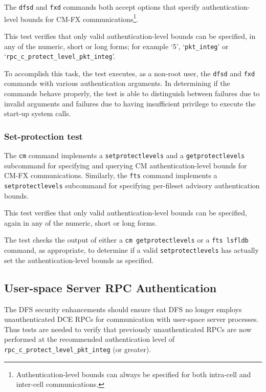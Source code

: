 The {\tt dfsd} and {\tt fxd} commands both accept options that
specify authentication-level
bounds for CM-FX communications\footnote{Authentication-level bounds
can always be specified for both intra-cell and inter-cell communications.}.

This test verifies that only valid authentication-level
bounds can be specified, in any of the numeric, short or long forms;
for example `5', `{\tt pkt\_integ}'
or `{\tt rpc\_c\_protect\_level\_pkt\_integ}'.

To accomplish this task, the test executes,
as a non-root user, the {\tt dfsd} and {\tt fxd}
commands with various authentication arguments.
In determining if the commands behave properly,
the test is able to distinguish between failures due to
invalid arguments and failures due to having insufficient privilege to
execute the start-up system calls.

\subsubsection{Set-protection test}

\begin{sloppypar}
The {\tt cm} command implements a {\tt setprotectlevels} and
a {\tt getprotectlevels} subcommand for specifying and querying CM
authentication-level bounds for CM-FX communications.
Similarly, the {\tt fts} command implements a {\tt setprotectlevels}
subcommand for specifying per-fileset advisory authentication bounds.
\end{sloppypar}

This test verifies that only valid authentication-level bounds can
be specified, again in any of the numeric, short or long forms.

The test checks the output of either a {\tt cm getprotectlevels} or
a {\tt fts lsfldb} command, as appropriate, to determine if a
valid {\tt setprotectlevels} has actually set the authentication-level
bounds as specified.



\subsection{User-space Server RPC Authentication}

\begin{sloppypar}
The DFS security enhancements should ensure that DFS no longer employs
unauthenticated DCE RPCs for communication with user-space server processes.
Thus tests are needed to verify that previously unauthenticated RPCs are
now performed at the recommended authentication level
of {\tt rpc\_c\_protect\_level\_pkt\_integ} (or greater).
\end{sloppypar}

